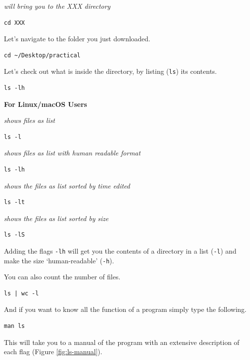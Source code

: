 \documentclass[
]{book}
\begin{document}
\emph{will bring you to the XXX directory}

\begin{verbatim}
cd XXX 
\end{verbatim}

Let's navigate to the folder you just downloaded.

\begin{verbatim}
cd ~/Desktop/practical
\end{verbatim}

Let's check out what is inside the directory, by listing (\texttt{ls}) its contents.

\begin{verbatim}
ls -lh
\end{verbatim}

\textbf{For Linux/macOS Users}

\emph{shows files as list}

\begin{verbatim}
ls -l 
\end{verbatim}

\emph{shows files as list with human readable format }

\begin{verbatim}
ls -lh 
\end{verbatim}

\emph{shows the files as list sorted by time edited}

\begin{verbatim}
ls -lt 
\end{verbatim}

\emph{shows the files as list sorted by size}

\begin{verbatim}
ls -lS 
\end{verbatim}

Adding the flags \texttt{-lh} will get you the contents of a directory in a list (\texttt{-l}) and make the size `human-readable' (\texttt{-h}).

You can also count the number of files.

\begin{verbatim}
ls | wc -l
\end{verbatim}

And if you want to know all the function of a program simply type the following.

\begin{verbatim}
man ls
\end{verbatim}

This will take you to a manual of the program with an extensive description of each flag (Figure \ref{fig:ls-manual}).
\end{document}
